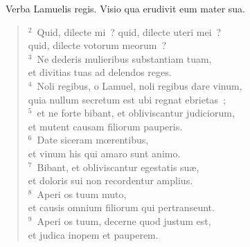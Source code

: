~\lettrine[lines=10,image=true,loversize=0.05,lraise=-0.03]{V}{}erba Lamuelis regis. Visio qua erudivit eum mater sua.
\begin{flushleft}\begin{verse}\vspace{6pt}${}^{2}$~Quid, dilecte mi~? quid, dilecte uteri mei~?\\ quid, dilecte votorum meorum~?\\
${}^{3}$~Ne dederis mulieribus substantiam tuam,\\ et divitias tuas ad delendos reges.\\
${}^{4}$~Noli regibus, o Lamuel, noli regibus dare vinum,\\ quia nullum secretum est ubi regnat ebrietas~;\\
${}^{5}$~et ne forte bibant, et obliviscantur judiciorum,\\ et mutent causam filiorum pauperis.\\
${}^{6}$~Date siceram mœrentibus,\\ et vinum his qui amaro sunt animo.\\
${}^{7}$~Bibant, et obliviscantur egestatis su\ae ,\\ et doloris sui non recordentur amplius.\\
${}^{8}$~Aperi os tuum muto,\\ et causis omnium filiorum qui pertranseunt.\\
${}^{9}$~Aperi os tuum, decerne quod justum est,\\ et judica inopem et pauperem.\end{verse}\end{flushleft}


